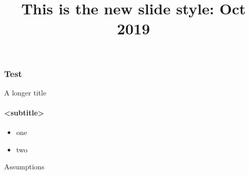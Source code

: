 \documentclass{beamer}
\begin{document}
\begin{frame}
\title{This is the new slide style: \newline Oct 2019}
\titlepage
\end{frame}

\begin{frame}
	\frametitle{Test}
\end{frame}

\begin{frame}{A longer title} 
	\framesubtitle{<subtitle>}
	\begin{itemize}
		\item one
		\item two
	\end{itemize}
Assumptions
\end{frame}
\end{document}

